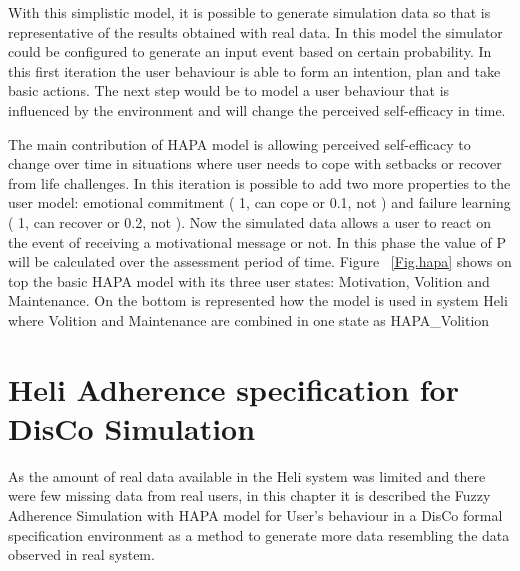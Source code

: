 \documentclass[graybox]{svmult}
\begin{document}
With this simplistic model, it is possible to generate simulation data so that is representative of the results obtained with real data. In this model the simulator could be configured to generate an input event based on certain probability. In this first iteration the user behaviour is able to form an intention, plan and take basic actions. The next step would be to model a user behaviour that is influenced by the environment and will change the perceived self-efficacy in time.

The main contribution of HAPA model is allowing perceived self-efficacy to change over time in situations where user needs to cope with setbacks or recover from life challenges. In this iteration is possible to add two more properties to the user model: emotional commitment ( 1, can cope or 0.1, not ) and failure learning ( 1, can recover or 0.2, not ). Now the simulated data allows a user to react on the event of receiving a motivational message or not. In this phase the value of P will be calculated over the assessment period of time.
Figure ~\ref{Fig.hapa} shows on top the basic HAPA model with its three user states: Motivation, Volition and Maintenance. On the bottom is represented how the model is used in system Heli where Volition and Maintenance are combined in one state as HAPA\_Volition

\section {Heli Adherence specification for DisCo Simulation}
\label{sec.helimodel}

As the amount of real data available in the Heli system was limited and there were few missing data from real users, in this chapter it is described the Fuzzy Adherence Simulation with HAPA model for User's behaviour in a DisCo formal specification environment as a method to generate more data resembling the data observed in real system.
\end{document}

